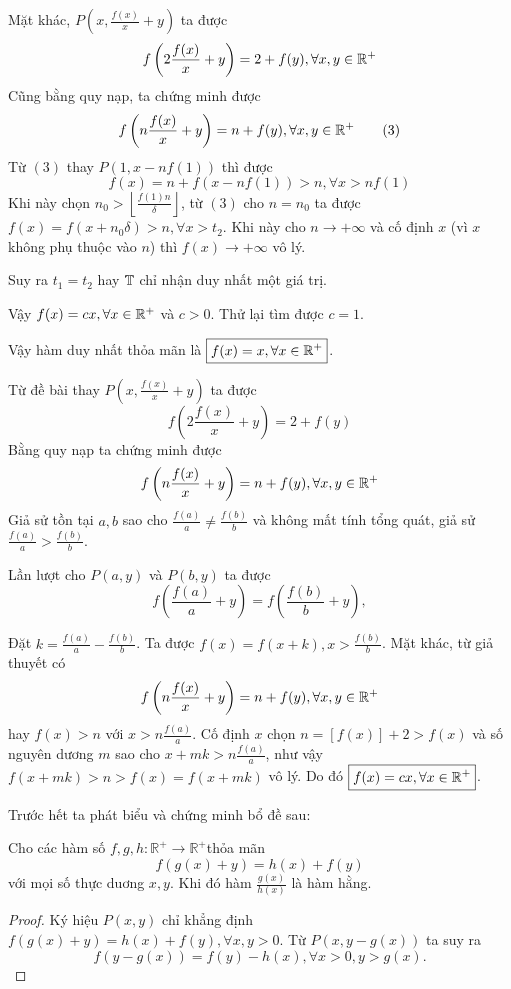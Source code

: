 \documentclass[11pt]{scrartcl}
\begin{document}
\begin{itemize}[label=, leftmargin=0em, itemsep=0.5em]
\begin{sol}
        Mặt khác, $P(x, \frac{f(x)}{x} + y)$ ta được 
        \[
            f\left(2\frac{f(x)}{x}+y\right)=2+f(y), \xyro
        \]
        Cũng bằng quy nạp, ta chứng minh được 
        \[
            f\left(n\frac{f(x)}{x}+y\right)=n+f(y), \xyro \tag{3}
        \]
        Từ $(3)$ thay $P(1,x - nf(1))$ thì được 
        \[
            f(x) = n + f(x - nf(1)) > n ,\forall x > nf(1)
        \]
        Khi này chọn $n_0 > \left\lfloor \frac{f(1)n}{\delta}\right\rfloor$, từ $(3)$ cho $n = n_0$ ta được $f(x) = f(x + n_0\delta) > n, \forall x > t_2$. Khi này cho $n \to +\infty$ và cố định $x$ (vì $x$ không phụ thuộc vào $n$) thì $f(x) \to +\infty$ vô lý. 

        Suy ra $t_1 = t_2$ hay $\mathbb{T}$ chỉ nhận duy nhất một giá trị.

        Vậy $f(x) = cx, \forall x\in \mathbb{R^+}$ và $c > 0$. Thử lại tìm được $c = 1$. 

        Vậy hàm duy nhất thỏa mãn là $\boxed{f(x) = x, \forall x\in \mathbb{R^+}}$.

        Từ đề bài thay $P(x, \frac{f(x)}{x} + y)$ ta được 
        \[
            f\left(2\frac{f(x)}{x} + y\right) = 2 + f(y)
        \]
        Bằng quy nạp ta chứng minh được 
        \[
            f\left(n\frac{f(x)}{x} + y\right) = n + f(y),\xyro
        \]
        Giả sử tồn tại $a,b$ sao cho $\frac{f(a)}{a} \neq \frac{f(b)}{b}$ và không mất tính tổng quát, giả sử $\frac{f(a)}{a} > \frac{f(b)}{b}$. 
        
        Lần lượt cho $P(a,y)$ và $P(b,y)$ ta được \[f\left(\frac{f(a)}{a} + y\right) = f\left(\frac{f(b)}{b} + y\right),\tag{2}\]

        Đặt $k = \frac{f(a)}{a} - \frac{f(b)}{b}$. Ta được $f(x) = f(x + k), x > \frac{f(b)}{b}$. Mặt khác, từ giả thuyết có 
        \[
            f\left(n\frac{f(x)}{x} + y\right) = n + f(y), \xyro
        \]
        hay $f(x) > n$ với $x > n\frac{f(a)}{a}$. Cố định $x$ chọn $n = [f(x)] + 2 > f(x)$ và số nguyên dương $m$ sao cho $x + mk  > n\frac{f(a)}{a}$, như vậy $f(x + mk)  > n > f(x) = f(x + mk)$ vô lý. Do đó $\boxed{f(x) = cx, \forall x\in \mathbb{R^+}}$.

         Trước hết ta phát biểu và chứng minh bổ đề sau:
        \begin{lemma}
            Cho các hàm số $f, g, h: \mathbb{R}^{+} \rightarrow \mathbb{R}^{+}$thỏa mãn
            $$
            f(g(x)+y)=h(x)+f(y)
            $$
            với mọi số thực duơng $x, y$. Khi đó hàm $\frac{g(x)}{h(x)}$ là hàm hằng.
        \end{lemma}
        \begin{proof}
            Ký hiệu $P(x, y)$ chỉ khẳng định $f(g(x)+y)=h(x)+f(y), \forall x, y>0$. Từ $P(x, y-g(x))$ ta suy ra
                $$
                f(y-g(x))=f(y)-h(x), \forall x>0, y>g(x) .
                $$


\end{proof}
\end{sol}
\end{itemize}
\end{document}
